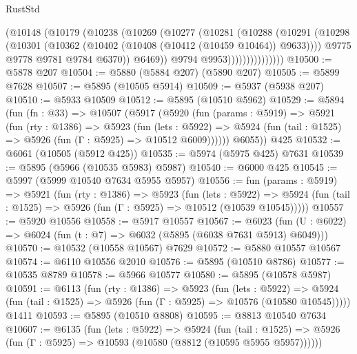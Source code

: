 \begin{lexlean}{RustStd}
\begin{coremodule}
{{                        (@10148
                          (@10179
                            (@10238
                              (@10269
                                (@10277
                                  (@10281
                                    (@10288
                                      (@10291
                                        (@10298
                                          (@10301
                                            (@10362
                                              (@10402 (@10408 (@10412 (@10459 @10464)) @9633))))
                                          @9775
                                          @9778
                                          @9781
                                          @9784
                                          @6370))
                                      @6469))
                                  @9794
                                  @9953)))))))))))))))
@10500 := @5878 @207
@10504 := @5880 (@5884 @207) (@5890 @207)
@10505 := @5899 @7628
@10507 := @5895 (@10505 @5914)
@10509 := @5937 (@5938 @207)
@10510 := @5933 @10509
@10512 := @5895 (@10510 @5962)
@10529 := @5894
    (fun (fn : @33) =>
    @10507
      (@5917
        (@5920
          (fun (params : @5919) =>
          @5921
            (fun (rty : @1386) =>
            @5923
              (fun (lets : @5922) =>
              @5924 (fun (tail : @1525) => @5926 (fun (Γ : @5925) => @10512 @6009))))))
        @6055))
    @425
@10532 := @6061 (@10505 (@5912 @425))
@10535 := @5974 (@5975 @425) @7631
@10539 := @5895 (@5966 (@10535 @5983) @5987)
@10540 := @6000 @425
@10545 := @5997 (@5999 @10540 @7634 @5955 @5957)
@10556 := fun (params : @5919) =>
  @5921
    (fun (rty : @1386) =>
    @5923
      (fun (lets : @5922) =>
      @5924 (fun (tail : @1525) => @5926 (fun (Γ : @5925) => @10512 (@10539 @10545)))))
@10557 := @5920 @10556
@10558 := @5917 @10557
@10567 := @6023 (fun (U : @6022) => @6024 (fun (t : @7) => @6032 (@5895 (@6038 @7631 @5913) @6049)))
@10570 := @10532 (@10558 @10567) @7629
@10572 := @5880 @10557 @10567
@10574 := @6110 @10556 @2010
@10576 := @5895 (@10510 @8786)
@10577 := @10535 @8789
@10578 := @5966 @10577
@10580 := @5895 (@10578 @5987)
@10591 := @6113
    (fun (rty : @1386) =>
    @5923
      (fun (lets : @5922) =>
      @5924 (fun (tail : @1525) => @5926 (fun (Γ : @5925) => @10576 (@10580 @10545)))))
    @1411
@10593 := @5895 (@10510 @8808)
@10595 := @8813 @10540 @7634
@10607 := @6135
    (fun (lets : @5922) =>
    @5924
      (fun (tail : @1525) =>
      @5926 (fun (Γ : @5925) => @10593 (@10580 (@8812 (@10595 @5955 @5957))))))
}}
\end{coremodule}
\end{lexlean}
